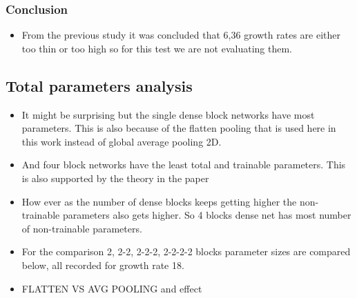 

\subsubsection{Conclusion}
\begin{itemize}
 \item From the previous study it was concluded that 6,36 growth rates are either too thin or too high so for this test we are not evaluating them.
\end{itemize}

\subsection{Total parameters analysis}
\begin{itemize}
 \item It might be surprising but the single dense block networks have most parameters. This is also because of the flatten pooling that is used here in this work instead of global average pooling 2D. 
 \item And four block networks have the least total and trainable parameters. This is also supported by the theory in the paper
 \item How ever as the number of dense blocks keeps getting higher the non-trainable parameters also gets higher. So 4 blocks dense net has most number of non-trainable parameters.
 \item For the comparison 2, 2-2, 2-2-2, 2-2-2-2 blocks parameter sizes are compared below, all recorded for growth rate 18.
 \item FLATTEN VS AVG POOLING and effect
\end{itemize}


